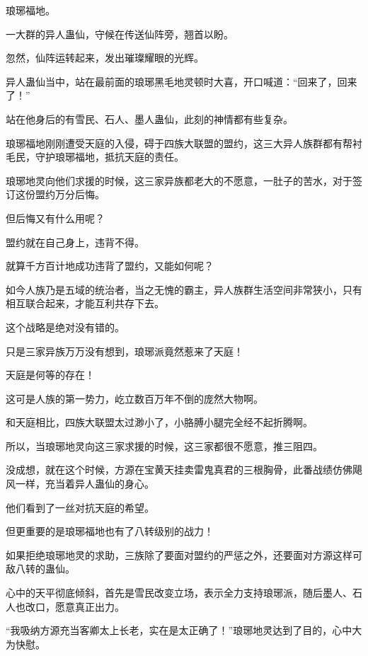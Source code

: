 
\begin{this_body}



琅琊福地。

一大群的异人蛊仙，守候在传送仙阵旁，翘首以盼。

忽然，仙阵运转起来，发出璀璨耀眼的光辉。

异人蛊仙当中，站在最前面的琅琊黑毛地灵顿时大喜，开口喊道：“回来了，回来了！”

站在他身后的有雪民、石人、墨人蛊仙，此刻的神情都有些复杂。

琅琊福地刚刚遭受天庭的入侵，碍于四族大联盟的盟约，这三大异人族群都有帮衬毛民，守护琅琊福地，抵抗天庭的责任。

琅琊地灵向他们求援的时候，这三家异族都老大的不愿意，一肚子的苦水，对于签订这份盟约万分后悔。

但后悔又有什么用呢？

盟约就在自己身上，违背不得。

就算千方百计地成功违背了盟约，又能如何呢？

如今人族乃是五域的统治者，当之无愧的霸主，异人族群生活空间非常狭小，只有相互联合起来，才能互利共存下去。

这个战略是绝对没有错的。

只是三家异族万万没有想到，琅琊派竟然惹来了天庭！

天庭是何等的存在！

这可是人族的第一势力，屹立数百万年不倒的庞然大物啊。

和天庭相比，四族大联盟太过渺小了，小胳膊小腿完全经不起折腾啊。

所以，当琅琊地灵向这三家求援的时候，这三家都很不愿意，推三阻四。

没成想，就在这个时候，方源在宝黄天挂卖雷鬼真君的三根胸骨，此番战绩仿佛飓风一样，充当着异人蛊仙的身心。

他们看到了一丝对抗天庭的希望。

但更重要的是琅琊福地也有了八转级别的战力！

如果拒绝琅琊地灵的求助，三族除了要面对盟约的严惩之外，还要面对方源这样可敌八转的蛊仙。

心中的天平彻底倾斜，首先是雪民改变立场，表示全力支持琅琊派，随后墨人、石人也改口，愿意真正出力。

“我吸纳方源充当客卿太上长老，实在是太正确了！”琅琊地灵达到了目的，心中大为快慰。


\end{this_body}
